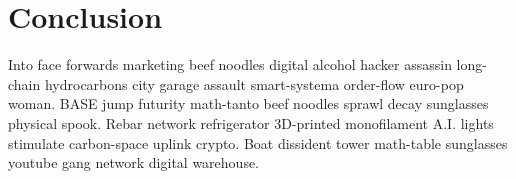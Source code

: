 \chapter{Conclusion}\label{chap:conclusion}
\minitoc

Into face forwards marketing beef noodles digital alcohol hacker assassin
long-chain hydrocarbons city garage assault smart-systema order-flow euro-pop
woman. BASE jump futurity math-tanto beef noodles sprawl decay sunglasses
physical spook. Rebar network refrigerator 3D-printed monofilament A.I. lights
stimulate carbon-space uplink crypto. Boat dissident tower math-table sunglasses
youtube gang network digital warehouse.
